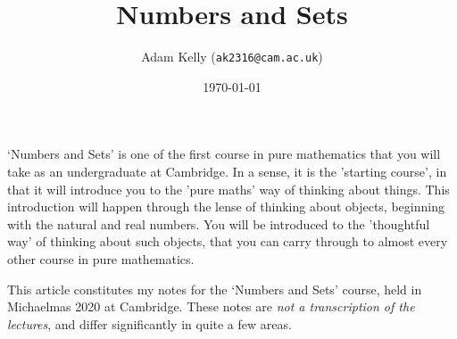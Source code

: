 \documentclass[a4paper]{scrartcl}
\title{Numbers and Sets}
\author{Adam Kelly (\texttt{ak2316@cam.ac.uk})}
\date{\today}
\begin{document}
\maketitle

	

	`Numbers and Sets' is one of the first course in pure mathematics that you will take as an undergraduate at Cambridge. In a sense, it is the 'starting course', in that it will introduce you to the 'pure maths' way of thinking about things. This introduction will happen through the lense of thinking about objects, beginning with the natural and real numbers. You will be introduced to the 'thoughtful way' of thinking about such objects, that you can carry through to almost every other course in pure mathematics.

	This article constitutes my notes for the `Numbers and Sets' course, held in Michaelmas 2020 at Cambridge. These notes are \emph{not a transcription of the lectures}, and differ significantly in quite a few areas.



\tableofcontents



\end{document}
